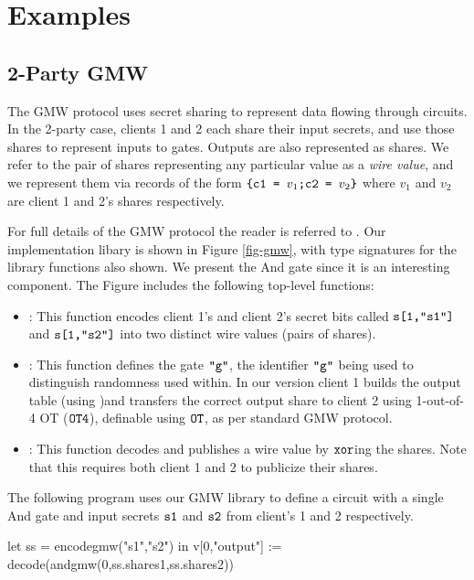 \section{Examples}

\subsection{2-Party GMW}
\label{section-metalang-gmw}



The GMW protocol uses secret sharing to represent data flowing through
circuits. In the 2-party case, clients 1 and 2 each share their input
secrets, and use those shares to represent inputs to gates. Outputs
are also represented as shares. We refer to the pair of shares
representing any particular value as a \emph{wire value}, and
we represent them via records of the form
$
\texttt{\{c1 = } v_1\texttt{;c2 = } v_2\texttt{\}} 
$
where $v_1$ and $v_2$ are client 1 and 2's shares respectively.

For full details of the GMW protocol the reader is referred to
\cite{evans2018pragmatic}. Our implementation libary is shown in
Figure \ref{fig-gmw}, with type signatures for the library functions
also shown. We present the And gate since it is
an interesting component. The Figure includes the
following top-level functions:
\begin{itemize}
\item {}: This function encodes client 1's and client 2's
  secret bits called $\texttt{s[1,"s1"]}$ and $\texttt{s[1,"s2"]}$ into two
  distinct wire values (pairs of shares).
\item {}: This function defines the gate $\texttt{"g"}$, the
  identifier $\texttt{"g"}$ being used to distinguish randomness used
  within.  In our version client 1 builds the output table (using
  )and transfers the correct output share to client 2
  using 1-out-of-4 OT ($\texttt{OT4}$), definable using $\texttt{OT}$, as
  per standard GMW protocol.
\item {}: This function decodes and publishes a wire value
  by $\texttt{xor}$ing the shares. Note that this requires both client 1
  and 2 to publicize their shares.
\end{itemize}
\begin{example}
  \label{example-gmw-andcircuit}
The following program uses our GMW library to define
a circuit with a single And gate and input secrets $\texttt{s1}$ and
$\texttt{s2}$ from client's 1 and 2 respectively. 
{\small
  \begin{verbatimtab}
  let ss = encodegmw("s1","s2") in v[0,"output"] := decode(andgmw(0,ss.shares1,ss.shares2)) \end{verbatimtab}
}
\end{example}


